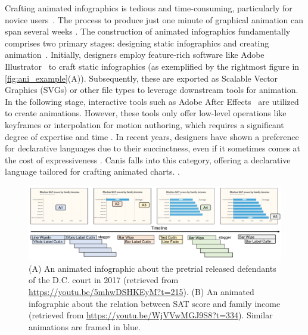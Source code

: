 Crafting animated infographics is tedious and time-consuming, particularly for novice users~\cite{amini2016authoring, hullman2013deeper, shi2021communicating}. The process to produce just one minute of graphical animation can span several weeks \cite{howlong}.
The construction of animated infographics fundamentally comprises two primary stages: designing static infographics and creating animation~\cite{jahanlou2020challenges, shi2021communicating}. Initially, designers employ feature-rich software like Adobe Illustrator~\cite{AdobeAI} to craft static infographics (as exemplified by the rightmost figure in \autoref{fig:ani_example}(A)). Subsequently, these are exported as Scalable Vector Graphics (SVGs) or other file types to leverage downstream tools for animation. 
In the following stage, interactive tools such as Adobe After Effects~\cite{AdobeAE} are utilized to create animations. However, these tools only offer low-level operations like keyframes or interpolation for motion authoring, which requires a significant degree of expertise and time \cite{jahanlou2020challenges}. 
In recent years, designers have shown a preference for declarative languages due to their succinctness, even if it sometimes comes at the cost of expressiveness \cite{mcnutt2023nogrammar}. Canis \cite{ge2020canis} falls into this category, offering a declarative language tailored for crafting animated charts. 
.



\begin{figure}[h]
  \centering
  \includegraphics[width=\linewidth]{figs/ani_example_tvcg.pdf}
  \caption{(A) An animated infographic about the pretrial released defendants of the D.C. court in 2017 (retrieved from \url{https://youtu.be/5mhwDSHKEyM?t=215}). (B) An animated infographic about the relation between SAT score and family income (retrieved from \url{https://youtu.be/WjVVwMGJ9S8?t=334}). Similar animations are framed in blue. }
  \label{fig:ani_example}
\end{figure}

